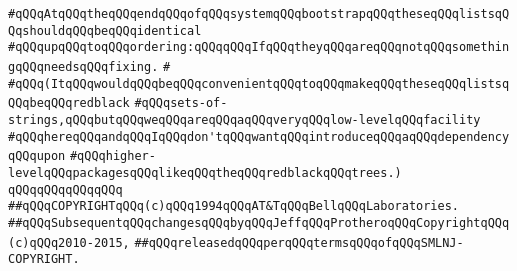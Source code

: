 \verb|#qQQqAtqQQqtheqQQqendqQQqofqQQqsystemqQQqbootstrapqQQqtheseqQQqlistsqQQqshouldqQQqbeqQQqidentical|\newline
\verb|#qQQqupqQQqtoqQQqordering:qQQqqQQqIfqQQqtheyqQQqareqQQqnotqQQqsomethingqQQqneedsqQQqfixing.|\newline
\verb|#|\newline
\verb|#qQQq(ItqQQqwouldqQQqbeqQQqconvenientqQQqtoqQQqmakeqQQqtheseqQQqlistsqQQqbeqQQqredblack|\newline
\verb|#qQQqsets-of-strings,qQQqbutqQQqweqQQqareqQQqaqQQqveryqQQqlow-levelqQQqfacility|\newline
\verb|#qQQqhereqQQqandqQQqIqQQqdon'tqQQqwantqQQqintroduceqQQqaqQQqdependencyqQQqupon|\newline
\verb|#qQQqhigher-levelqQQqpackagesqQQqlikeqQQqtheqQQqredblackqQQqtrees.)|\newline
\newline
\newline
\verb|qQQqqQQqqQQqqQQq|\newline
\verb|##qQQqCOPYRIGHTqQQq(c)qQQq1994qQQqAT&TqQQqBellqQQqLaboratories.|\newline
\verb|##qQQqSubsequentqQQqchangesqQQqbyqQQqJeffqQQqProtheroqQQqCopyrightqQQq(c)qQQq2010-2015,|\newline
\verb|##qQQqreleasedqQQqperqQQqtermsqQQqofqQQqSMLNJ-COPYRIGHT.|\newline

